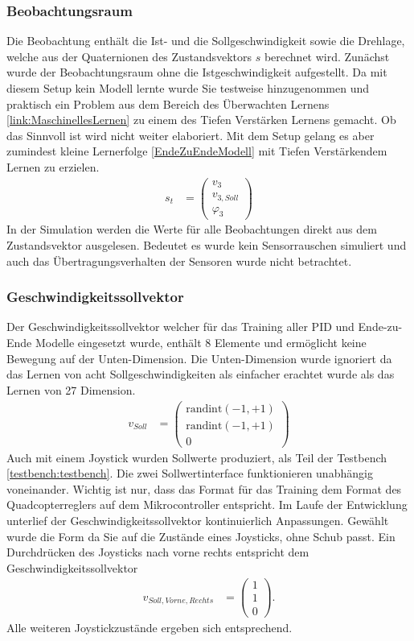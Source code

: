 \subsubsection{Beobachtungsraum}
Die Beobachtung enthält die Ist- und die Sollgeschwindigkeit sowie die Drehlage, welche aus der Quaternionen des Zustandsvektors $s$ berechnet wird. Zunächst wurde der Beobachtungsraum ohne die Istgeschwindigkeit aufgestellt. Da mit diesem Setup kein Modell lernte wurde Sie testweise hinzugenommen und praktisch ein Problem aus dem Bereich des Überwachten Lernens \ref{link:MaschinellesLernen} zu einem des Tiefen Verstärken Lernens gemacht. Ob das Sinnvoll ist wird nicht weiter elaboriert. Mit dem Setup gelang es aber zumindest kleine Lernerfolge \ref{EndeZuEndeModell} mit Tiefen Verstärkendem Lernen zu erzielen.
\begin{align}
	s_t &= \begin{pmatrix}
		v_3\\
		v_{3, Soll}\\
		\varphi_3
	\end{pmatrix}
\end{align}
In der Simulation werden die Werte für alle Beobachtungen direkt aus dem Zustandsvektor ausgelesen. Bedeutet es wurde kein Sensorrauschen simuliert und auch das Übertragungsverhalten der Sensoren wurde nicht betrachtet. 

\subsubsection{\label{Geschwindigkeitssollvektor}Geschwindigkeitssollvektor}
Der Geschwindigkeitssollvektor welcher für das Training aller PID und Ende-zu-Ende Modelle eingesetzt wurde, enthält 8 Elemente und ermöglicht keine Bewegung auf der Unten-Dimension. Die Unten-Dimension wurde ignoriert da das Lernen von acht Sollgeschwindigkeiten als einfacher erachtet wurde als das Lernen von 27 Dimension.
\begin{align}
	v_{Soll} &= \begin{pmatrix}
		\text{randint}(-1, +1)\\
		\text{randint}(-1, +1)\\
		0
	\end{pmatrix}
\end{align}
Auch mit einem Joystick wurden Sollwerte produziert, als Teil der Testbench \ref{testbench:testbench}. Die zwei Sollwertinterface funktionieren unabhängig voneinander. Wichtig ist nur, dass das Format für das Training dem Format des Quadcopterreglers auf dem Mikrocontroller entspricht.
Im Laufe der Entwicklung unterlief der Geschwindigkeitssollvektor kontinuierlich Anpassungen. Gewählt wurde die Form da Sie auf die Zustände eines Joysticks, ohne Schub passt. Ein Durchdrücken des Joysticks nach vorne rechts entspricht dem Geschwindigkeitssollvektor
\begin{align}
	v_{Soll,Vorne,Rechts} &= \begin{pmatrix}
		1\\
		1\\
		0
	\end{pmatrix}.
\end{align}
Alle weiteren Joystickzustände ergeben sich entsprechend. 

